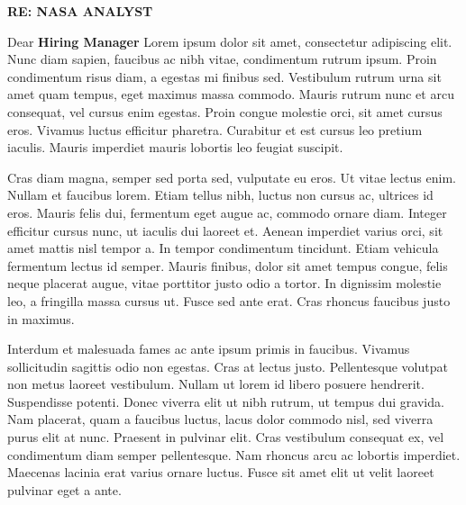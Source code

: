 \documentclass{article}
\begin{document}
\vspace{0.5cm}
\begin{tcolorbox}[
    colback = headingLetterBackgrown,
    colframe = letterFrameColor
]
    \textcolor{headingLetter}{\Large \textbf{RE: NASA ANALYST}}
\end{tcolorbox}
\begin{tcolorbox}[
    title = \textcolor{headingLetter}{\faEnvelope \hfill \today},
    colback = letterFrameBackground,
    colframe = letterFrameColor
]
    \setlength{\parindent}{1em}
    \setlength{\parskip}{1em}
    Dear \textbf{Hiring Manager}
    Lorem ipsum dolor sit amet, consectetur adipiscing elit. Nunc diam sapien, faucibus ac nibh vitae, condimentum rutrum ipsum. Proin condimentum risus diam, a egestas mi finibus sed. Vestibulum rutrum urna sit amet quam tempus, eget maximus massa commodo. Mauris rutrum nunc et arcu consequat, vel cursus enim egestas. Proin congue molestie orci, sit amet cursus eros. Vivamus luctus efficitur pharetra. Curabitur et est cursus leo pretium iaculis. Mauris imperdiet mauris lobortis leo feugiat suscipit.

    Cras diam magna, semper sed porta sed, vulputate eu eros. Ut vitae lectus enim. Nullam et faucibus lorem. Etiam tellus nibh, luctus non cursus ac, ultrices id eros. Mauris felis dui, fermentum eget augue ac, commodo ornare diam. Integer efficitur cursus nunc, ut iaculis dui laoreet et. Aenean imperdiet varius orci, sit amet mattis nisl tempor a. In tempor condimentum tincidunt. Etiam vehicula fermentum lectus id semper. Mauris finibus, dolor sit amet tempus congue, felis neque placerat augue, vitae porttitor justo odio a tortor. In dignissim molestie leo, a fringilla massa cursus ut. Fusce sed ante erat. Cras rhoncus faucibus justo in maximus.

    Interdum et malesuada fames ac ante ipsum primis in faucibus. Vivamus sollicitudin sagittis odio non egestas. Cras at lectus justo. Pellentesque volutpat non metus laoreet vestibulum. Nullam ut lorem id libero posuere hendrerit. Suspendisse potenti. Donec viverra elit ut nibh rutrum, ut tempus dui gravida. Nam placerat, quam a faucibus luctus, lacus dolor commodo nisl, sed viverra purus elit at nunc. Praesent in pulvinar elit. Cras vestibulum consequat ex, vel condimentum diam semper pellentesque. Nam rhoncus arcu ac lobortis imperdiet. Maecenas lacinia erat varius ornare luctus. Fusce sit amet elit ut velit laoreet pulvinar eget a ante.


\end{tcolorbox}
\end{document}
